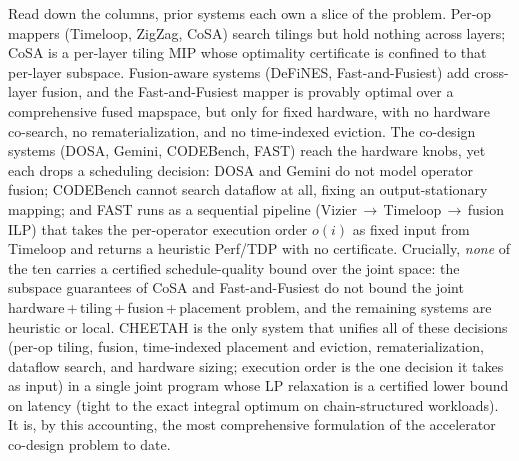 Read down the columns, prior systems each own a slice of the problem. Per-op
mappers (Timeloop, ZigZag, CoSA) search tilings but hold nothing across layers;
CoSA is a per-layer tiling MIP whose optimality certificate is confined to that
per-layer subspace. Fusion-aware systems (DeFiNES, Fast-and-Fusiest) add
cross-layer fusion, and the Fast-and-Fusiest mapper is provably optimal over a
comprehensive fused mapspace, but only for fixed hardware, with no hardware
co-search, no rematerialization, and no time-indexed eviction. The co-design
systems (DOSA, Gemini, CODEBench, FAST) reach the hardware knobs, yet each drops
a scheduling decision: DOSA and Gemini do not model operator fusion; CODEBench
cannot search dataflow at all, fixing an output-stationary mapping; and FAST
runs as a sequential pipeline (Vizier\,$\to$\,Timeloop\,$\to$\,fusion ILP) that
takes the per-operator execution order $o(i)$ as fixed input from Timeloop and
returns a heuristic Perf/TDP with no certificate. Crucially, \emph{none} of the
ten carries a certified schedule-quality bound over the joint space: the
subspace guarantees of CoSA and Fast-and-Fusiest do not bound the joint
hardware\,+\,tiling\,+\,fusion\,+\,placement problem, and the remaining systems
are heuristic or local. CHEETAH is the only system that unifies all of these
decisions (per-op tiling, fusion, time-indexed placement and eviction,
rematerialization, dataflow search, and hardware sizing; execution order is
the one decision it takes as input) in a
single joint program whose LP relaxation is a certified lower bound on latency
(tight to the exact integral optimum on chain-structured workloads). It is, by
this accounting, the most comprehensive formulation of the accelerator
co-design problem to date.

